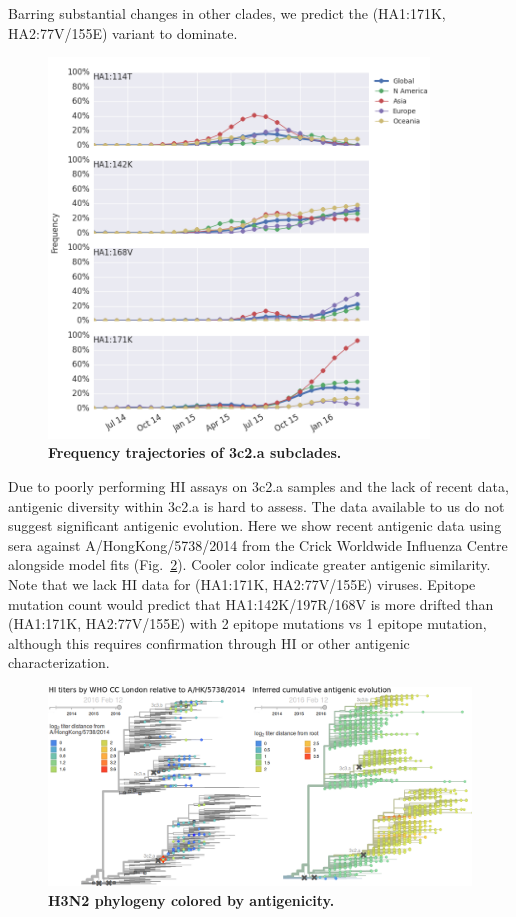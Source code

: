 \documentclass[11pt,oneside,letterpaper]{article}
\begin{document}
Barring substantial changes in other clades, we predict the (HA1:171K, HA2:77V/155E) variant to dominate.

\begin{figure}[h!]
	\centering		
	\includegraphics[width=0.9\textwidth]{../figures/feb-2016/H3N2_mutations.png}
	\caption{\textbf{Frequency trajectories of 3c2.a subclades.} 
	}
	\label{H3N2_mutations}
\end{figure}

\pagebreak

Due to poorly performing HI assays on 3c2.a samples and the lack of recent data, antigenic diversity within 3c2.a is hard to assess. The data available to us do not suggest significant antigenic evolution. Here we show recent antigenic data using sera against A/HongKong/5738/2014 from the Crick Worldwide Influenza Centre alongside model fits \cite{neher2015prediction} (Fig.\ \ref{H3N2_HI}). Cooler color indicate greater antigenic similarity. Note that we lack HI data for (HA1:171K, HA2:77V/155E) viruses. Epitope mutation count would predict that HA1:142K/197R/168V is more drifted than (HA1:171K, HA2:77V/155E) with 2 epitope mutations vs 1 epitope mutation, although this requires confirmation through HI or other antigenic characterization.

\begin{figure}[h!]
	\centering		
	\includegraphics[width=1.0\textwidth]{../figures/feb-2016/H3N2_HI.png}
	\caption{\textbf{H3N2 phylogeny colored by antigenicity.} 
	}
	\label{H3N2_HI}
\end{figure}
\end{document}
